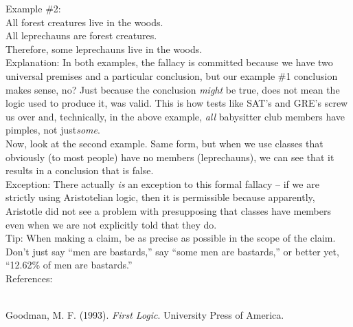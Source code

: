 \documentclass[a4paper,12pt,single,pdftex]{scrartcl}
\begin{document}
    
      Example \#2: 
    \\

    
      All forest creatures live in the woods.
    \\

    
      All leprechauns are forest creatures.
    \\

    
      Therefore, some leprechauns live in the woods.
    \\

    
      Explanation: In both examples, the fallacy is committed because we have two universal premises and a particular conclusion, but our example \#1 conclusion makes sense, no?  Just because the conclusion {\it might}  be true, does not mean the logic used to produce it, was valid.  This is how tests like SAT’s and GRE’s screw us over and, technically, in the above example, {\it all} babysitter club members have pimples, not just{\it   some}.
    \\

    
      Now, look at the second example.  Same form, but when we use classes that obviously (to most people) have no members (leprechauns), we can see that it results in a conclusion that is false. 
    \\

    
      Exception: There actually {\it is} an exception to this formal fallacy -- if we are strictly using Aristotelian logic, then it is permissible because apparently, Aristotle did not see a problem with presupposing that classes have members even when we are not explicitly told that they do.
    \\

    
      Tip: When making a claim, be as precise as possible in the scope of the claim. Don’t just say “men are bastards,” say “some men are bastards,” or better yet, “12.62\% of men are bastards.”
    \\

    References:

    
      
        
      \\

      
        
          Goodman, M. F. (1993). {\it First Logic}. University Press of America.
        
      
    
\end{document}
